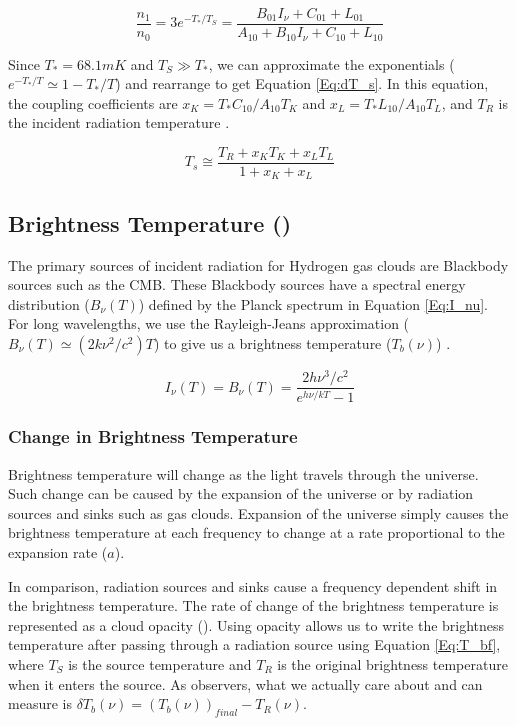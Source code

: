 \begin{equation}
\frac{n_1}{n_0} = 3 e^{-T_*/T_S} = \frac{B_{01} I_\nu + C_{01}+ L_{01}}{A_{10}+ B_{10} I_\nu + C_{10} +L_{10}}
\end{equation}

Since $T_* = 68.1 mK$ and $T_S \gg T_*$, we can approximate the exponentials ($e^{-T_*/T} \simeq 1-T_*/T$) and rearrange to get Equation \ref{Eq:dT_s}. In this equation, the coupling coefficients are $x_K = T_* C_{10}/A_{10} T_K$ and $x_L = T_* L_{10} / A_{10} T_L$, and $T_R$ is the incident \cm radiation temperature \cite{field_1958}.

\begin{equation}\label{Eq:dT_s}
T_s \cong \frac{T_{R} + x_K T_{K} + x_{L} T_{L}}{1+x_K +x_{L}}
\end{equation}


\subsection{Brightness Temperature (\tb)}

The primary sources of incident radiation for Hydrogen gas clouds are Blackbody sources such as the CMB. These Blackbody sources have a spectral energy distribution ($B_\nu (T)$) defined by the Planck spectrum in Equation \ref{Eq:I_nu}. For long wavelengths, we use the Rayleigh-Jeans approximation ($B_{\nu} (T) \simeq (2 k \nu^2 / c^2) T$) to give us a brightness temperature ($T_b (\nu)$) \cite{carroll2007}. 

\begin{equation} \label{Eq:I_nu}
I_{\nu} (T) = B_{\nu}(T) = \frac{ 2 h \nu^3 / c^2}{e^{h \nu / k T}-1}
\end{equation}


\subsubsection{Change in Brightness Temperature}

Brightness temperature will change as the light travels through the universe. Such change can be caused by the expansion of the universe or by radiation sources and sinks such as gas clouds. Expansion of the universe simply causes the brightness temperature at each frequency to change at a rate proportional to the expansion rate ($a$). 

In comparison, radiation sources and sinks cause a frequency dependent shift in the brightness temperature. The rate of change of the brightness temperature is represented as a cloud opacity (\tu). Using opacity allows us to write the brightness temperature after passing through a radiation source using Equation \ref{Eq:T_bf}, where $T_{S}$ is the source temperature and $T_{R}$ is the original brightness temperature when it enters the source. As observers, what we actually care about and can measure is $\delta T_b (\nu) = (T_b (\nu))_{final} - T_R  (\nu)$. 

